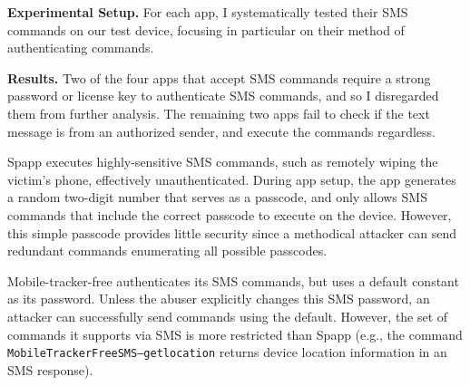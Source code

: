\textbf{Experimental Setup.}
For each app, I systematically tested their SMS commands on our test
device, focusing in particular on their method of authenticating commands. 

\textbf{Results.}  Two of the four apps that accept SMS commands
require a strong password or license key to authenticate SMS commands,
and so I disregarded them from further analysis.
The remaining two apps fail to check if the text message is from an
authorized sender, and execute the commands regardless.




Spapp executes highly-sensitive SMS commands, such as remotely wiping
the victim's phone, effectively unauthenticated.  During app setup,
the app generates a random two-digit number that serves as a passcode,
and only allows SMS commands that include the correct passcode to
execute on the device.  However, this simple passcode provides little
security since a methodical attacker can send redundant commands
enumerating all possible passcodes.

Mobile-tracker-free authenticates its SMS commands, but uses a default
constant as its password.  Unless the abuser explicitly changes this
SMS password, an attacker can successfully send commands using the
default.  However, the set of commands it supports via SMS is more
restricted than Spapp (e.g., the
command \texttt{MobileTrackerFreeSMS--getlocation}
returns device location information in an SMS response).

